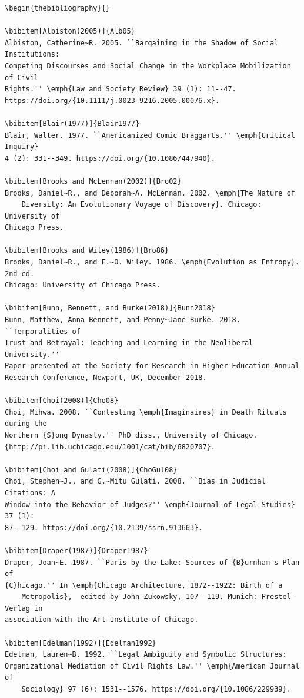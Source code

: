 \documentclass[]{interact}
\theoremstyle{plain}%
\theoremstyle{definition}
\theoremstyle{remark}
\begin{document}
\begin{verbatim}
\begin{thebibliography}{}

\bibitem[Albiston(2005)]{Alb05}
Albiston, Catherine~R. 2005. ``Bargaining in the Shadow of Social Institutions:
Competing Discourses and Social Change in the Workplace Mobilization of Civil
Rights.'' \emph{Law and Society Review} 39 (1): 11--47.
https://doi.org/{10.1111/j.0023-9216.2005.00076.x}.

\bibitem[Blair(1977)]{Blair1977}
Blair, Walter. 1977. ``Americanized Comic Braggarts.'' \emph{Critical Inquiry}
4 (2): 331--349. https://doi.org/{10.1086/447940}.

\bibitem[Brooks and McLennan(2002)]{Bro02}
Brooks, Daniel~R., and Deborah~A. McLennan. 2002. \emph{The Nature of
	Diversity: An Evolutionary Voyage of Discovery}. Chicago: University of
Chicago Press.

\bibitem[Brooks and Wiley(1986)]{Bro86}
Brooks, Daniel~R., and E.~O. Wiley. 1986. \emph{Evolution as Entropy}. 2nd ed.
Chicago: University of Chicago Press.

\bibitem[Bunn, Bennett, and Burke(2018)]{Bunn2018}
Bunn, Matthew, Anna Bennett, and Penny~Jane Burke. 2018. ``Temporalities of
Trust and Betrayal: Teaching and Learning in the Neoliberal University.''
Paper presented at the Society for Research in Higher Education Annual
Research Conference, Newport, UK, December 2018.

\bibitem[Choi(2008)]{Cho08}
Choi, Mihwa. 2008. ``Contesting \emph{Imaginaires} in Death Rituals during the
Northern {S}ong Dynasty.'' PhD diss., University of Chicago.
{http://pi.lib.uchicago.edu/1001/cat/bib/6820707}.

\bibitem[Choi and Gulati(2008)]{ChoGul08}
Choi, Stephen~J., and G.~Mitu Gulati. 2008. ``Bias in Judicial Citations: A
Window into the Behavior of Judges?'' \emph{Journal of Legal Studies} 37 (1):
87--129. https://doi.org/{10.2139/ssrn.913663}.

\bibitem[Draper(1987)]{Draper1987}
Draper, Joan~E. 1987. ``Paris by the Lake: Sources of {B}urnham's Plan of
{C}hicago.'' In \emph{Chicago Architecture, 1872--1922: Birth of a
	Metropolis},  edited by John Zukowsky, 107--119. Munich: Prestel-Verlag in
association with the Art Institute of Chicago.

\bibitem[Edelman(1992)]{Edelman1992}
Edelman, Lauren~B. 1992. ``Legal Ambiguity and Symbolic Structures:
Organizational Mediation of Civil Rights Law.'' \emph{American Journal of
	Sociology} 97 (6): 1531--1576. https://doi.org/{10.1086/229939}.


\end{verbatim}
\end{document}
